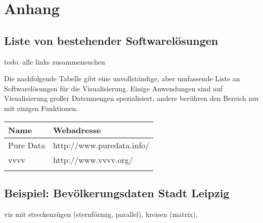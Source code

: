 \documentclass[a4paper, 12pt, DIVcalc, onepage, pdftex, headsepline, footsepline]{scrreprt}
\begin{document}
\chapter{Anhang}
\section{Liste von bestehender Softwarelösungen}
todo: alle links zusammensuchen

Die nachfolgende Tabelle gibt eine unvollständige, aber umfassende
Liste an Softwarelösungen für die Visualisierung. Einige Anwendungen
sind auf Visualisierung großer Datenmengen spezialisiert, andere
berühren den Bereich nur mit einigen Funktionen.

\begin{tabular}{l|l}
\hline
Name & Webadresse \\
\hline
Pure Data & http://www.puredata.info/ \\
vvvv & http://www.vvvv.org/ \\
\label{tab:Softwareliste}
\end{tabular}
\section{Beispiel: Bevölkerungsdaten Stadt Leipzig}
viz mit streckenzügen (sternförmig, parallel), kreisen (matrix),


\listoftables
\listoffigures
\end{document}
